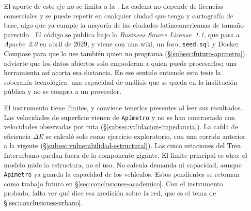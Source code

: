 El aporte de este eje no se limita a la \zmvm{}. La cadena no depende de
licencias comerciales y se puede repetir en cualquier ciudad que tenga
 \gtfs{} y cartografía de base, algo que ya cumple la mayoría de las ciudades
latinoamericanas de tamaño parecido \citep{barrington2017world}. El código se
publica bajo la \textit{Business Source License~1.1}, que pasa a
\textit{Apache~2.0} en abril de 2029, y viene con una wiki, un foro,
\texttt{seed.sql} y Docker Compose para que lo use también quien no programa
(§\ref{subsec:futuro-apimetro}). \citet{gurstein2011open} advierte que los
datos abiertos solo empoderan a quien puede procesarlos; una herramienta así
acorta esa distancia. En ese sentido entiende esta tesis la soberanía
tecnológica: una capacidad de análisis que se queda en la institución pública y
no se compra a un proveedor.

El instrumento tiene límites, y conviene tenerlos presentes al leer sus
resultados. Las velocidades de superficie vienen de \texttt{Apímetro} y no se
han contrastado con velocidades observadas por ruta
(§\ref{subsec:validacion-impedancia}). La caída de eficiencia $\Delta E$ se
calculó solo como ejercicio exploratorio, con una corrida anterior a la vigente
(§\ref{subsec:vulnerabilidad-estructural}). Las cinco estaciones del Tren
Interurbano quedan fuera de la componente gigante. El límite principal es otro:
el modelo mide la estructura, no el uso. No calcula demanda ni capacidad, aunque
\texttt{Apímetro} ya guarda la capacidad de los vehículos. Estos pendientes se
retoman como trabajo futuro en §\ref{sec:conclusiones-academico}. Con el
instrumento probado, falta ver qué dice esa medición sobre la red, que es el
tema de §\ref{sec:conclusiones-urbano}.
